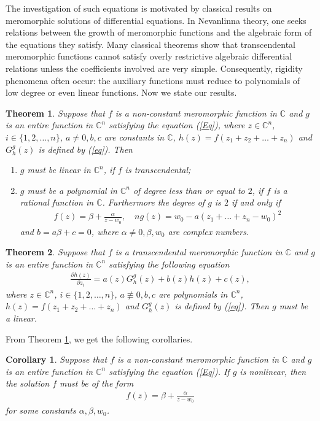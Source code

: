 \documentclass[11pt,reqno]{amsart}
\newtheorem{theo}{Theorem}[section]
\newtheorem{cor}{Corollary}[section]
\numberwithin{equation}{section}
\begin{document}
The investigation of such equations is motivated by classical results on meromorphic solutions of differential equations. In Nevanlinna theory, one seeks relations between the growth of meromorphic functions and the algebraic form of the equations they satisfy. Many classical theorems show that transcendental meromorphic functions cannot satisfy overly restrictive algebraic differential relations unless the coefficients involved are very simple. Consequently, rigidity phenomena often occur: the auxiliary functions must reduce to polynomials of low degree or even linear functions.
Now we state our results.

\begin{theo}\label{t1.1} Suppose that $f$ is a non-constant meromorphic function in $\mathbb{C}$ and $g$ is an entire function in $\mathbb{C}^n$ satisfying the equation (\ref{Eq}),
where $z\in\mathbb{C}^n$, $i\in\{1,2,\ldots,n\}$, $a\neq 0, b,c$ are constants in $\mathbb{C}$, $h(z)=f(z_1+z_2+\ldots+z_n)$ and $G^g_h(z)$ is defined by (\ref{eq}). Then 
\begin{enumerate}
\item[(i)] $g$ must be linear in $\mathbb{C}^n$, if $f$ is transcendental;
\item[(ii)] $g$ must be a polynomial in $\mathbb{C}^n$ of degree less than or equal to $2$, if $f$ is a rational function in $\mathbb{C}$. Furthermore the degree of $g$ is $2$ if and only if 
\begin{align*}
f(z)=\beta+\frac{\alpha}{z-w_0},\quad ng(z)=w_0-a\left(z_1+\ldots+z_n-w_0\right)^2
\end{align*}
and $b=a\beta+c=0$, where $\alpha\neq 0, \beta, w_0$ are complex numbers.
\end{enumerate}
\end{theo}

\begin{theo}\label{t1.2} Suppose that $f$ is a transcendental meromorphic function in $\mathbb{C}$ and $g$ is an entire function in $\mathbb{C}^n$ satisfying the following equation
\begin{align}\label{Eq1}
\frac{\partial h(z)}{\partial z_i}=a(z) G^g_{h}(z)+b(z)h(z)+c(z),
\end{align}
where $z\in\mathbb{C}^n$, $i\in\{1,2,\ldots,n\}$, $a\not\equiv  0, b,c$ are polynomials in $\mathbb{C}^n$, $h(z)=f(z_1+z_2+\ldots+z_n)$ and $G^g_h(z)$ is defined by (\ref{eq}). Then $g$ must be a linear.
\end{theo}

From Theorem \ref{t1.1}, we get the following corollaries.
\begin{cor}Suppose that $f$ is a non-constant meromorphic function in $\mathbb{C}$ and $g$ is an entire function in $\mathbb{C}^n$ satisfying the equation (\ref{Eq}). If $g$ is nonlinear, then the solution $f$ must be of the form
\begin{align*}
f(z)=\beta+\frac{\alpha}{z-w_0}
\end{align*}
for some constants $\alpha,\beta, w_0$.
\end{cor}
\end{document}
